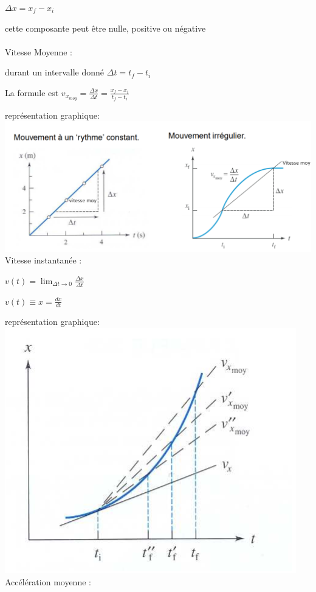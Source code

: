 \documentclass[]{article}
\begin{document}
$\Delta x = x_f - x_i$

cette composante peut être nulle, positive ou négative
\\\\
Vitesse Moyenne :

durant un intervalle donné $\Delta t = t_f - t_i$

La formule est $v_{x_{moy}}= \frac{\Delta x}{\Delta t} = \frac{x_f-x_i}{t_f-t_i}$

représentation graphique:\\
\includegraphics[scale=0.65]{vitesse_moy_graphe.png}\\
\newpage
Vitesse instantanée :

$v(t)=\displaystyle \lim_{\Delta t \to 0}\frac{\Delta x}{\Delta t}$

$v(t)\equiv x = \frac{dx}{dt}$

représentation graphique:\\
\includegraphics[scale=0.65]{vitesse_inst_graphe}\\
Accélération moyenne :
\end{document}
